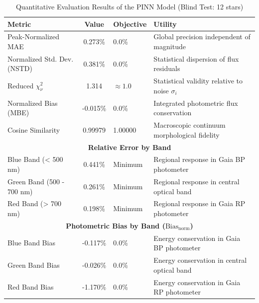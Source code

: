 
\begin{table}[htpb]
\centering
\caption{Quantitative Evaluation Results of the PINN Model (Blind Test: 12 stars)}
\label{tab:pinn_evaluation}
\begin{tabular}{lcll}
\hline
\textbf{Metric} & \textbf{Value} & \textbf{Objective} & \textbf{Utility} \\
\hline
Peak-Normalized MAE & 0.273\% & 0.0\% & Global precision independent of magnitude \\
Normalized Std. Dev. (NSTD) & 0.381\% & 0.0\% & Statistical dispersion of flux residuals \\
Reduced $\chi^2_\nu$ & 1.314 & $\approx 1.0$ & Statistical validity relative to noise $\sigma_i$ \\
Normalized Bias (MBE) & -0.015\% & 0.0\% & Integrated photometric flux conservation \\
Cosine Similarity & 0.99979 & 1.00000 & Macroscopic continuum morphological fidelity \\
\hline
\multicolumn{4}{c}{\textbf{Relative Error by Band}} \\
\hline
Blue Band (< 500 nm) & 0.441\% & Minimum & Regional response in Gaia BP photometer \\
Green Band (500 - 700 nm) & 0.261\% & Minimum & Regional response in central optical band \\
Red Band (> 700 nm) & 0.198\% & Minimum & Regional response in Gaia RP photometer \\
\hline
\multicolumn{4}{c}{\textbf{Photometric Bias by Band ($\text{Bias}_{\text{norm}}$)}} \\
\hline
Blue Band Bias & -0.117\% & 0.0\% & Energy conservation in Gaia BP photometer \\
Green Band Bias & -0.026\% & 0.0\% & Energy conservation in central optical band \\
Red Band Bias & -1.170\% & 0.0\% & Energy conservation in Gaia RP photometer \\
\hline
\end{tabular}
\end{table}

